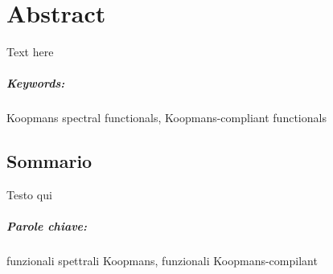 \begingroup
\let\cleardoublepage\clearpage

\cleardoublepage
\chapter*{Abstract}
\vspace{2cm}
%
Text here
%
\paragraph{Keywords:}
Koopmans spectral functionals,
Koopmans-compliant functionals
%

\begin{otherlanguage}{italian}
\cleardoublepage
\chapter*{Sommario}
\vspace{2cm}
%
Testo qui
%
\paragraph{Parole chiave:}
funzionali spettrali Koopmans,
funzionali Koopmans-compilant
%
\end{otherlanguage}

\endgroup			
\vfill
